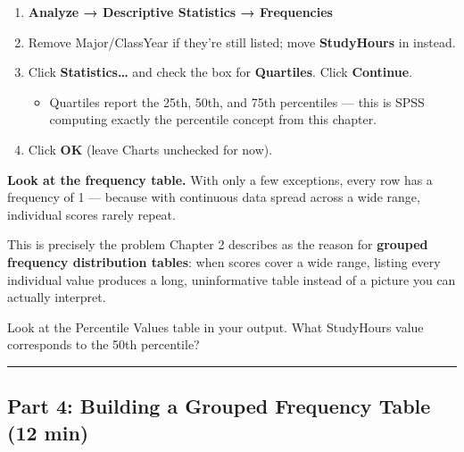 \documentclass[
  11pt,
]{article}
\providecommand{\tightlist}{%
  \setlength{\itemsep}{0pt}\setlength{\parskip}{0pt}}\usepackage{longtable,booktabs,array}
\begin{document}
\begin{enumerate}
\def\labelenumi{\arabic{enumi}.}
\tightlist
\item
  \textbf{Analyze → Descriptive Statistics → Frequencies}
\item
  Remove Major/ClassYear if they're still listed; move
  \textbf{StudyHours} in instead.
\item
  Click \textbf{Statistics\ldots{}} and check the box for
  \textbf{Quartiles}. Click \textbf{Continue}.

  \begin{itemize}
  \tightlist
  \item
    Quartiles report the 25th, 50th, and 75th percentiles --- this is
    SPSS computing exactly the percentile concept from this chapter.
  \end{itemize}
\item
  Click \textbf{OK} (leave Charts unchecked for now).
\end{enumerate}

\textbf{Look at the frequency table.} With only a few exceptions, every
row has a frequency of 1 --- because with continuous data spread across
a wide range, individual scores rarely repeat.

This is precisely the problem Chapter 2 describes as the reason for
\textbf{grouped frequency distribution tables}: when scores cover a wide
range, listing every individual value produces a long, uninformative
table instead of a picture you can actually interpret.

\begin{tcolorbox}[enhanced jigsaw, toptitle=1mm, colbacktitle=quarto-callout-tip-color!10!white, bottomtitle=1mm, arc=.35mm, colback=white, leftrule=.75mm, toprule=.15mm, left=2mm, opacityback=0, coltitle=black, colframe=quarto-callout-tip-color-frame, titlerule=0mm, title=\textcolor{quarto-callout-tip-color}{\faLightbulb}\hspace{0.5em}{Checkpoint}, breakable, rightrule=.15mm, opacitybacktitle=0.6, bottomrule=.15mm]

Look at the Percentile Values table in your output. What StudyHours
value corresponds to the 50th percentile?

\end{tcolorbox}

\begin{center}\rule{0.5\linewidth}{0.5pt}\end{center}

\subsection{Part 4: Building a Grouped Frequency Table (12
min)}\label{part-4-building-a-grouped-frequency-table-12-min}
\end{document}
